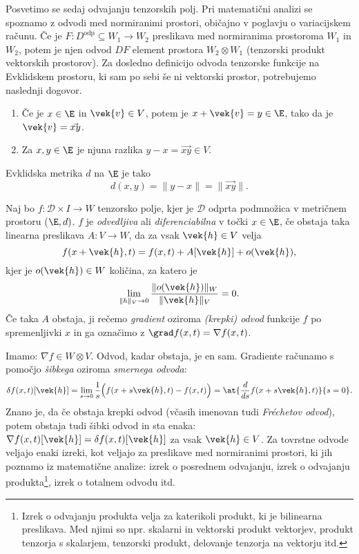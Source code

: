 Posvetimo se sedaj odvajanju tenzorskih polj. Pri matematični analizi se spoznamo z odvodi med normiranimi prostori,
običajno v poglavju o variacijskem računu.
Če je $F:D^{\mathrm{odp}}\subseteq W_1\rightarrow W_2$ preslikava med normiranima prostoroma $W_1$ in $W_2$,
potem je njen odvod $DF$ element prostora $W_2\otimes W_1$ (tenzorski produkt vektorskih prostorov).
Za dosledno definicijo odvoda tenzorske funkcije na Evklidskem prostoru, ki sam po sebi še ni vektorski prostor,
potrebujemo naslednji dogovor.
\begin{enumerate}
	\item Če je $x\in\E$ in $\vek{v}\in V$, potem je $x+\vek{v}=y\in\E$, tako da je $\vek{v}=\vec{xy}$.
	\item Za $x,y\in \E$ je njuna razlika $y-x=\vec{xy}\in V$.
\end{enumerate}
Evklidska metrika $d$ na $\E$ je tako
\begin{equation*}
	d(x,y)=\|y-x\|=\|\vec{xy}\|.
\end{equation*}
\begin{definicija}
	Naj bo $f:\mathcal{D}\times I\rightarrow W$ tenzorsko polje, kjer je $\mathcal{D}$ odprta
	podmnožica v metričnem prostoru ($\E,d)$. $f$ je \emph{odvedljiva} ali \emph{diferenciabilna} v točki $x\in\E$,
	če obstaja taka linearna preslikava $A:V\rightarrow W$, da za vsak $\vek{h}\in V$ velja
	\begin{equation*}
		f(x+\vek{h},t)=f(x,t)+A[\vek{h}]+o(\vek{h}),
	\end{equation*}
	kjer je $o(\vek{h})\in W$ količina, za katero je
	\[ \lim_{\| h\|_V\to 0}\frac{\|o(\vek{h})\|_W}{\|\vek{h}\|_V}=0. \]
	Če taka $A$ obstaja, ji rečemo \emph{gradient} oziroma \emph{(krepki) odvod} funkcije $f$ po spremenljivki $x$
	in ga označimo z $\grad f(x,t)=\nabla f(x,t)$.
\end{definicija}
Imamo: $\nabla f \in W\otimes V$. Odvod, kadar obstaja, je en sam. Gradiente računamo s pomočjo
\emph{šibkega} oziroma \emph{smernega odvoda}:
\begin{equation*}
	\delta f(x,t)[\vek{h}]=\lim_{s\to 0}\frac{1}{s}\Big(f(x+s\vek{h},t)-f(x,t)\Big)=
	\at{\frac{d}{ds}f(x+s\vek{h},t)}{s=0}.
\end{equation*}
Znano je, da če obstaja krepki odvod (včasih imenovan tudi \emph{Fréchetov odvod}),
potem obstaja tudi šibki odvod in sta enaka: $\nabla f(x,t)[\vek{h}]=\delta f(x,t)[\vek{h}]$ za vsak $\vek{h}\in V$.
Za tovrstne odvode veljajo enaki izreki, kot veljajo za preslikave med normiranimi prostori, ki jih
poznamo iz matematične analize: izrek o posrednem odvajanju, izrek o odvajanju produkta\footnote{
Izrek o odvajanju produkta velja za katerikoli produkt, ki je bilinearna preslikava. Med njimi so
npr. skalarni in vektorski produkt vektorjev, produkt tenzorja s skalarjem, tenzorski produkt,
delovanje tenzorja na vektorju itd.},
izrek o totalnem odvodu itd.

